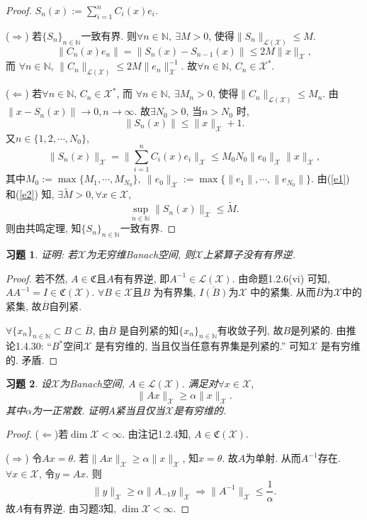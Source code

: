 \documentclass[UTF8,twoside]{ctexbook}
\newtheorem{exercise}{习题}[section]
\newcommand{\h}{\mathscr}
\newcommand{\kx}{\mathbb}
\numberwithin{equation}{section}
\begin{document}
	\begin{proof}
		$S_n(x):=\sum_{i=1}^n C_i(x)e_i$.

		($\Rightarrow$) 若$\{S_n\}_{n\in\kx N}$一致有界. 则$\forall n\in\kx N,\ \exists M>0$, 使得$\|S_n\|_{\h L(\h X)}\leq M$.
		\[
		\|C_n(x)e_n\|=\|S_n(x)-S_{n-1}(x)\|\leq 2M\|x\|_{\h X},
		\]
		而 $\forall n\in\kx N$, $\|C_n\|_{\h L(\h X)}\leq 2M\|e_n\|^{-1}_{\h X}$. 故$\forall n\in\kx N$, $C_n\in\h X^*$.

		($\Leftarrow$) 若$\forall n\in\kx N$, $C_n\in\h X^*$, 而 $\forall n\in\kx N,\ \exists M_n>0$, 使得$\|C_n\|_{\h L(\h X)}\leq M_n$.
		由$\|x-S_n(x)\|\rightarrow 0,n\rightarrow\infty$. 故$\exists N_0>0$, 当$n>N_0$ 时,
		\begin{equation}\label{e1}
		\|S_n(x)\|\leq\|x\|_{\h X}+1.
		\end{equation}
		又$n\in\{1,2,\cdots,N_0\}$,
		\begin{equation}\label{e2}
		\|S_n(x)\|_{\h X}=\|\sum_{i=1}^{n}C_i(x)e_i\|_{\h X}\leq M_0 N_0 \|e_0\|_{\h X} \|x\|_{\h X},
		\end{equation}
		其中$M_0:=\max\{M_1,\cdots,M_{N_0}\},\ \|e_0\|_{\h X}:=\max\{\|e_1\|,\cdots,\|e_{N_0}\|\}$. 由(\ref{e1}) 和(\ref{e2}) 知, $\exists \widetilde M > 0,\forall x\in\h X$,
		\[
		\sup_{n\in\kx N}\|S_n(x)\|_{\h X}\leq \widetilde M.
		\]
		则由共鸣定理, 知$\{S_n\}_{n\in\kx N}$一致有界.
	\end{proof}
	\begin{exercise}
		证明: 若$\h X$为无穷维Banach空间, 则$\h X$上紧算子没有有界逆.
	\end{exercise}
	\begin{proof}
		若不然, $A\in \mathfrak C$且$A$有有界逆, 即$A^{-1}\in\h L(\h X)$. 由命题1.2.6(vi) 可知, $AA^{-1}=I\in\mathfrak C(\h X)$. $\forall B\in\h X$且$B$ 为有界集, $\overline{I(B)}$为$\h X$ 中的紧集. 从而$\overline B$为$\h X$中的紧集, 故$\overline{B}$自列紧.

		$\forall\{x_n\}_{n\in\kx N}\subset B\subset \overline B$, 由$\overline B$ 是自列紧的知$\{x_n\}_{n\in\kx N}$有收敛子列, 故$B$是列紧的. 由\cite{zgq1990}推论1.4.30: “$B^*$空间$\h X$ 是有穷维的, 当且仅当任意有界集是列紧的.” 可知$\h X$ 是有穷维的. 矛盾.
	\end{proof}
	\begin{exercise}
		设$\h X$为Banach空间, $A\in\h L(\h X)$. 满足对$\forall x \in\h X$,
		\[
		\|Ax\|_{\h X}\geq\alpha \|x\|_{\h X}.
		\]
		其中$\alpha$为一正常数. 证明$A$紧当且仅当$\h X$是有穷维的.
	\end{exercise}
	\begin{proof}
		($\Leftarrow$)若$\dim \h X<\infty$. 由注记1.2.4知, $A\in \mathfrak C(\h X)$.

		($\Rightarrow$) 令$Ax=\theta$. 若$\|Ax\|_{\h X}\geq\alpha\|x\|_{\h X}$, 知$x=\theta$. 故$A$为单射. 从而$A^{-1}$存在. $\forall x\in\h X$, 令$y=Ax$. 则
		\[
		\|y\|_{\h X}\geq\alpha\|A_{-1}y\|_{\h X}\Rightarrow\|A^{-1}\|_{\h X}\leq \frac{1}{\alpha}.
		\]
		故$A$有有界逆. 由习题3知, $\dim \h X<\infty$.
	\end{proof}
\end{document}
